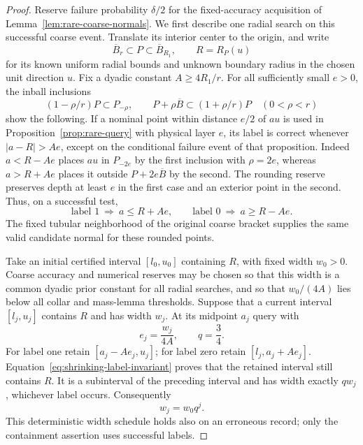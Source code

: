 \begin{proof}
Reserve failure probability $\delta/2$ for the fixed-accuracy acquisition
of Lemma~\ref{lem:rare-coarse-normals}. We first describe one radial
search on this successful coarse event. Translate its interior center
to the origin, and write
\[
 \overline B_r\subset P\subset\overline B_{R_1},
 \qquad R=R_P(u)
\]
for its known uniform radial bounds and unknown boundary radius in the
chosen unit direction $u$. Fix a dyadic constant $A\ge4R_1/r$.
For all sufficiently small $e>0$, the inball inclusions
\begin{equation}\label{eq:shrinking-radial-conversion}
 (1-\rho/r)P\subset P_{-\rho},\qquad
 P+\rho\overline B\subset(1+\rho/r)P
                      \quad(0<\rho<r)
\end{equation}
show the following. If a nominal point within distance $e/2$ of $au$
is used in Proposition~\ref{prop:rare-query} with physical layer $e$,
its label is correct whenever $|a-R|>Ae$, except on the conditional
failure event of that proposition. Indeed $a<R-Ae$ places $au$ in
$P_{-2e}$ by the first inclusion with $\rho=2e$, whereas
$a>R+Ae$ places it outside $P+2e\overline B$ by the second.
The rounding reserve preserves depth at least $e$ in the first case
and an exterior point in the second. Thus, on a successful test,
\begin{equation}\label{eq:shrinking-label-invariant}
 \text{label }1\ \Longrightarrow\ a\le R+Ae,
 \qquad
 \text{label }0\ \Longrightarrow\ a\ge R-Ae.
\end{equation}
The fixed tubular neighborhood of the original coarse bracket supplies
the same valid candidate normal for these rounded points.

Take an initial certified interval $[l_0,u_0]$ containing $R$, with
fixed width $w_0>0$. Coarse accuracy and numerical reserves may be
chosen so that this width is a common dyadic prior constant for all
radial searches, and so that $w_0/(4A)$ lies below all collar and
mass-lemma thresholds. Suppose that a current interval $[l_j,u_j]$
contains $R$ and has width $w_j$. At its midpoint $a_j$ query with
\begin{equation}\label{eq:shrinking-layer-schedule}
            e_j=\frac{w_j}{4A},\qquad q=\frac34.
\end{equation}
For label one retain $[a_j-Ae_j,u_j]$; for label zero retain
$[l_j,a_j+Ae_j]$. Equation~\eqref{eq:shrinking-label-invariant}
proves that the retained interval still contains $R$. It is a subinterval
of the preceding interval and has width exactly $q w_j$, whichever
label occurs. Consequently
\[
                     w_j=w_0q^j.
\]
This deterministic width schedule holds also on an erroneous record;
only the containment assertion uses successful labels.


\end{proof}
